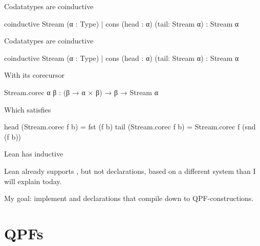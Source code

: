 \documentclass[t,12pt]{beamer}
\begin{document}


\begin{frame}[fragile]{Codatatypes are coinductive}
    \bigskip
\begin{leancode}
coinductive Stream (α : Type)
  | cons (head : α) (tail: Stream α) 
            : Stream α
\end{leancode}

     
    \end{frame}
    


\begin{frame}[fragile]{Codatatypes are coinductive}
    \bigskip
\begin{leancode}
coinductive Stream (α : Type)
  | cons (head : α) (tail: Stream α) 
            : Stream α
\end{leancode}

\bigskip
With its corecursor
\medskip

\begin{leancode}
Stream.corec {α β} : 
    (β → α × β) → β → Stream α 
\end{leancode}

Which satisfies
\begin{leancode}
head (Stream.corec f b) = fst (f b)
tail (Stream.corec f b) 
        = Stream.corec f (snd (f b))
\end{leancode}

     
    \end{frame}
    

\begin{frame}[fragile]{Lean has inductive}

    \medskip
    Lean already supports , but not  
    declarations, based on a different system than I will explain today.

    \bigskip

    My goal: implement  and  declarations 
    that compile down to QPF-constructions.
    
\end{frame}


\section*{QPFs}
\end{document}
